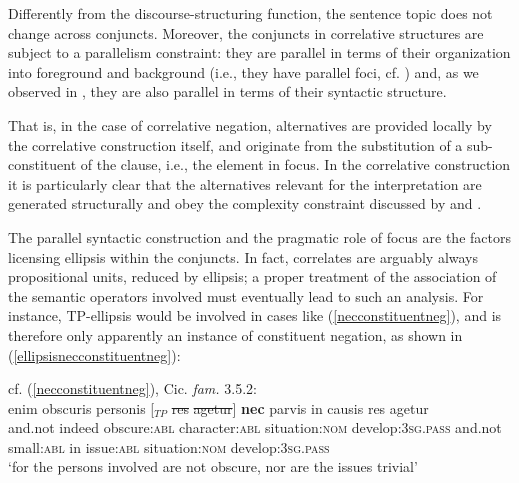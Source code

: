 \documentclass[output=paper,modfonts,nonflat,citecolor=brown,
showindex
]{langsci/langscibook}
\begin{document}
\noindent Differently from the discourse-structuring function, the sentence topic does not change across conjuncts. Moreover, the conjuncts in correlative structures are subject to a parallelism constraint: they are parallel in terms of their organization into foreground and background (i.e., they have parallel foci, cf. \citealt[64]{Koenig91}) and, as we observed in , they are also parallel in terms of their syntactic structure.

That is, in the case of correlative negation, alternatives are provided locally by the correlative construction itself, and originate from the substitution of a sub-constituent of the clause, i.e., the element in focus. In the correlative construction it is particularly clear that the alternatives relevant for the interpretation are generated structurally and obey the complexity constraint discussed by \citet{Katzir07} and \citet{FoxKatzir11}.

The parallel syntactic construction and the pragmatic role of focus are the factors licensing ellipsis within the conjuncts. In fact, correlates are arguably always propositional units, reduced by ellipsis; a proper treatment of the association of the semantic operators involved must eventually lead to such an analysis. For instance, TP-ellipsis would be involved in cases like (\ref{necconstituentneg}), and is therefore only apparently an instance of constituent negation, as shown in (\ref{ellipsisnecconstituentneg}):

{\begin{exe}
\ex \label{ellipsisnecconstituentneg} cf. (\ref{necconstituentneg}), Cic. {\emph{fam.}} 3.5.2:\\
 enim obscuris personis [$_{TP}$ \sout{res} \sout{agetur}] {\textbf{nec}} parvis in causis res agetur\\
and.not indeed obscure:{\textsc{abl}} character:{\textsc{abl}} {} situation:{\textsc{nom}} develop:{\textsc{3sg.pass}} and.not small:{\textsc{abl}} in issue:{\textsc{abl}} situation:{\textsc{nom}} develop:{\textsc{3sg.pass}}\\
\glt `for the persons involved are not obscure, nor are the issues trivial'
\end{exe}}
\end{document}
